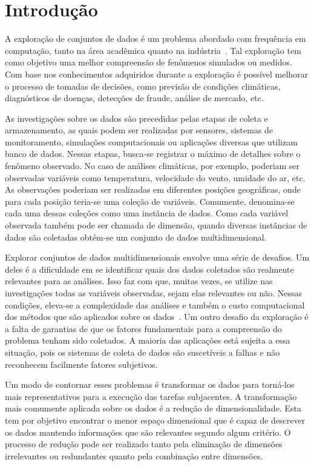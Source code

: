 \section{Introdução}

A exploração de conjuntos de dados é um problema abordado
com frequência em computação, tanto na área acadêmica quanto
na indústria~\cite{Ngai2009,Harding2006}. Tal exploração tem
como objetivo uma melhor compreensão de fenômenos simulados
ou medidos. Com base nos conhecimentos adquiridos durante a
exploração é possível melhorar o processo de tomadas de
decisões, como previsão de condições climáticas,
diagnósticos de doenças, detecções de fraude, análise de
mercado, etc.

As investigações sobre os dados são precedidas pelas etapas
de coleta e armazenamento, as quais podem ser
realizadas por sensores, sistemas de monitoramento,
simulações computacionais ou aplicações diversas que
utilizam banco de dados. Nessas etapas, busca-se registrar o
máximo de detalhes sobre o fenômeno observado. No caso de
análises climáticas, por exemplo, poderiam ser observadas
variáveis como temperatura, velocidade do vento, umidade do
ar, etc. As observações poderiam ser realizadas em
diferentes posições geográficas, onde para cada posição
teria-se uma coleção de variáveis. Comumente, denomina-se
cada uma dessas coleções como uma instância de dados.
Como cada variável observada também pode ser
chamada de dimensão, quando diversas instâncias de dados são
coletadas obtém-se um conjunto de dados multidimensional. 

Explorar conjuntos de dados multidimensionais envolve uma
série de desafios. Um deles é a dificuldade em se
identificar quais dos dados coletados são realmente
relevantes para as análises. Isso faz com que, muitas vezes,
se utilize nas investigações todas as variáveis observadas,
sejam elas relevantes ou não. Nessas condições, eleva-se a
complexidade das análises e também o custo computacional dos
métodos que são aplicados sobre os dados~\cite{Beyer1999}.
Um outro desafio da exploração é a falta de
garantias de que os fatores fundamentais para a compreensão
do problema tenham sido coletados. A maioria das aplicações
está sujeita a essa situação, pois os sistemas de coleta de
dados são suscetíveis a falhas e não reconhecem facilmente
fatores subjetivos. 

Um modo de contornar esses problemas é transformar os dados
para torná-los mais representativos para a execução das
tarefas subjacentes. A transformação mais comumente aplicada
sobre os dados é a redução de dimensionalidade. Esta tem
por objetivo encontrar o menor espaço dimensional que é
capaz de descrever os dados mantendo informações que são
relevantes segundo algum critério. O processo de redução
pode ser realizado tanto pela eliminação de dimensões
irrelevantes ou redundantes quanto pela combinação entre
dimensões. 

